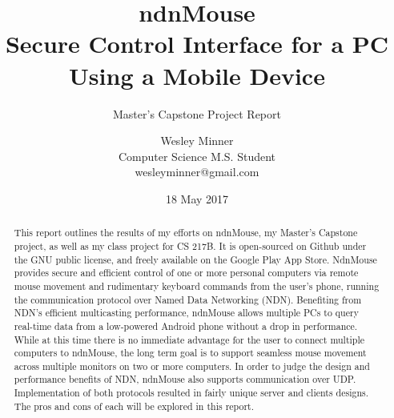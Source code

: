 \documentclass{sig-alternate}
\renewcommand\_{\textunderscore\allowbreak}  %
\begin{document}
	
\title{ndnMouse\\Secure Control Interface for a PC Using a Mobile Device}
\subtitle{Master's Capstone Project Report}
\author{
	Wesley Minner\\
	Computer Science M.S. Student\\
	wesleyminner@gmail.com
}

\date{18 May 2017}
\maketitle

\begin{abstract}
This report outlines the results of my efforts on ndnMouse, my Master's Capstone project, as well as my class project for CS 217B. It is open-sourced on Github under the GNU public license, and freely available on the Google Play App Store. NdnMouse provides secure and efficient control of one or more personal computers via remote mouse movement and rudimentary keyboard commands from the user's phone, running the communication protocol over Named Data Networking (NDN). Benefiting from NDN's efficient multicasting performance, ndnMouse allows multiple PCs to query real-time data from a low-powered Android phone without a drop in performance. While at this time there is no immediate advantage for the user to connect multiple computers to ndnMouse, the long term goal is to support seamless mouse movement across multiple monitors on two or more computers. In order to judge the design and performance benefits of NDN, ndnMouse also supports communication over UDP. Implementation of both protocols resulted in fairly unique server and clients designs. The pros and cons of each will be explored in this report.
\end{abstract}
\end{document}

